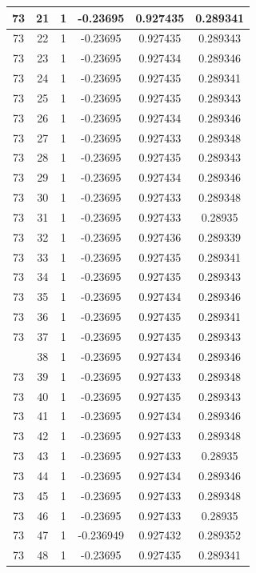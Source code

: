 \documentclass[12pt,a4paper]{article}
\numberwithin{equation}{section}
\numberwithin{figure}{section}
\numberwithin{table}{section}
\begin{document}
\begin{longtable}{|c|c|c|c|c|c|}
73 & 21 & 1 & -0.23695 & 0.927435 & 0.289341 \\ \hline
73 & 22 & 1 & -0.23695 & 0.927435 & 0.289343 \\ \hline
73 & 23 & 1 & -0.23695 & 0.927434 & 0.289346 \\ \hline
73 & 24 & 1 & -0.23695 & 0.927435 & 0.289341 \\ \hline
73 & 25 & 1 & -0.23695 & 0.927435 & 0.289343 \\ \hline
73 & 26 & 1 & -0.23695 & 0.927434 & 0.289346 \\ \hline
73 & 27 & 1 & -0.23695 & 0.927433 & 0.289348 \\ \hline
73 & 28 & 1 & -0.23695 & 0.927435 & 0.289343 \\ \hline
73 & 29 & 1 & -0.23695 & 0.927434 & 0.289346 \\ \hline
73 & 30 & 1 & -0.23695 & 0.927433 & 0.289348 \\ \hline
73 & 31 & 1 & -0.23695 & 0.927433 & 0.28935 \\ \hline
73 & 32 & 1 & -0.23695 & 0.927436 & 0.289339 \\ \hline
73 & 33 & 1 & -0.23695 & 0.927435 & 0.289341 \\ \hline
73 & 34 & 1 & -0.23695 & 0.927435 & 0.289343 \\ \hline
73 & 35 & 1 & -0.23695 & 0.927434 & 0.289346 \\ \hline
73 & 36 & 1 & -0.23695 & 0.927435 & 0.289341 \\ \hline
73 & 37 & 1 & -0.23695 & 0.927435 & 0.289343 \\ \hline
\pagebreak
73 & 38 & 1 & -0.23695 & 0.927434 & 0.289346 \\ \hline
73 & 39 & 1 & -0.23695 & 0.927433 & 0.289348 \\ \hline
73 & 40 & 1 & -0.23695 & 0.927435 & 0.289343 \\ \hline
73 & 41 & 1 & -0.23695 & 0.927434 & 0.289346 \\ \hline
73 & 42 & 1 & -0.23695 & 0.927433 & 0.289348 \\ \hline
73 & 43 & 1 & -0.23695 & 0.927433 & 0.28935 \\ \hline
73 & 44 & 1 & -0.23695 & 0.927434 & 0.289346 \\ \hline
73 & 45 & 1 & -0.23695 & 0.927433 & 0.289348 \\ \hline
73 & 46 & 1 & -0.23695 & 0.927433 & 0.28935 \\ \hline
73 & 47 & 1 & -0.236949 & 0.927432 & 0.289352 \\ \hline
73 & 48 & 1 & -0.23695 & 0.927435 & 0.289341 \\ \hline

\end{longtable}
\end{document}

